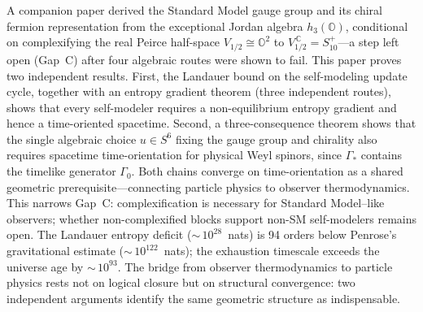 
A companion paper derived the Standard Model gauge group and its
chiral fermion representation from the exceptional Jordan algebra
$h_3(\mathbb{O})$, conditional on complexifying the real Peirce
half-space $V_{1/2} \cong \mathbb{O}^2$ to
$V_{1/2}^{\,\mathbb{C}} = S_{10}^+$---a step left open (Gap~C)
after four algebraic routes were shown to fail.  This paper proves
two independent results.  First, the Landauer bound on the
self-modeling update cycle, together with an entropy gradient theorem
(three independent routes), shows that every self-modeler requires a
non-equilibrium entropy gradient and hence a time-oriented spacetime.
Second, a three-consequence theorem shows that the single algebraic
choice $u \in S^6$ fixing the gauge group and chirality also requires
spacetime time-orientation for physical Weyl spinors, since
$\Gamma_*$ contains the timelike generator $\Gamma_0$.  Both chains
converge on time-orientation as a shared geometric
prerequisite---connecting particle physics to observer
thermodynamics.  This narrows Gap~C: complexification is necessary
for Standard Model--like observers; whether non-complexified blocks
support non-SM self-modelers remains open.  The Landauer entropy
deficit (${\sim}\,10^{28}$~nats) is 94 orders below Penrose's
gravitational estimate (${\sim}\,10^{122}$~nats); the exhaustion
timescale exceeds the universe age by ${\sim}\,10^{93}$.  The bridge
from observer thermodynamics to particle physics rests not on logical
closure but on structural convergence: two independent arguments
identify the same geometric structure as indispensable.
